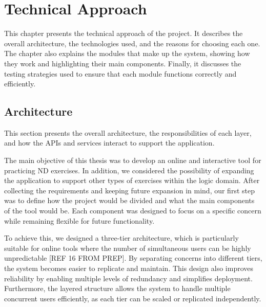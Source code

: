 %

\chapter{Technical Approach}
\label{chap:tech_approach}

This chapter presents the technical approach of the project. It describes the overall architecture, the technologies used, and the reasons for choosing each one. The chapter also explains the modules that make up the system, showing how they work and highlighting their main components. Finally, it discusses the testing strategies used to ensure that each module functions correctly and efficiently.

\section{Architecture}
This section presents the overall architecture, the responsibilities of each layer, and how the APIs and services interact to support the application.

The main objective of this thesis was to develop an online and interactive tool for practicing \gls{ND} exercises. In addition, we considered the possibility of expanding the application to support other types of exercises within the logic domain. After collecting the requirements and keeping future expansion in mind, our first step was to define how the project would be divided and what the main components of the tool would be. Each component was designed to focus on a specific concern while remaining flexible for future functionality. 

To achieve this, we designed a three-tier architecture, which is particularly suitable for online tools where the number of simultaneous users can be highly unpredictable [REF 16 FROM PREP]. By separating concerns into different tiers, the system becomes easier to replicate and maintain. This design also improves reliability by enabling multiple levels of redundancy and simplifies deployment. Furthermore, the layered structure allows the system to handle multiple concurrent users efficiently, as each tier can be scaled or replicated independently.

